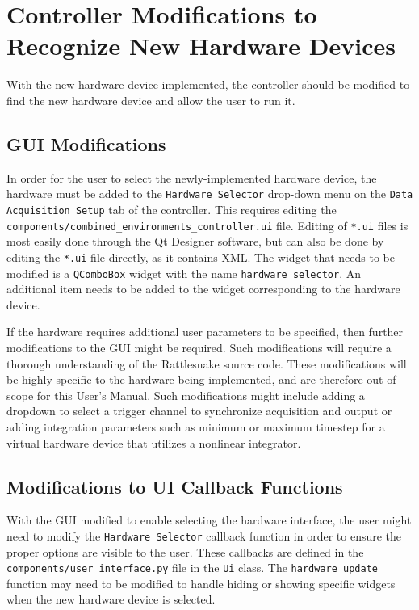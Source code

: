 \documentclass[pdf,12pt,report]{SANDreport}
\newcommand{\inlineCode}{\lstinline[basicstyle=\bfseries\ttfamily]}
\begin{document}
    \section{Controller Modifications to Recognize New Hardware Devices}
    With the new hardware device implemented, the controller should be modified to find the new hardware device and allow the user to run it.
    
    \subsection{\Ac{GUI} Modifications}
    In order for the user to select the newly-implemented hardware device, the hardware must be added to the \inlineCode{Hardware Selector} drop-down menu on the \inlineCode{Data Acquisition Setup} tab of the controller.  This requires editing the \inlineCode{components/combined_environments_controller.ui} file.  Editing of \inlineCode{*.ui} files is most easily done through the Qt Designer software, but can also be done by editing the \inlineCode{*.ui} file directly, as it contains XML.  The widget that needs to be modified is a \inlineCode{QComboBox} widget with the name \inlineCode{hardware_selector}.  An additional item needs to be added to the widget corresponding to the hardware device.
    
    If the hardware requires additional user parameters to be specified, then further modifications to the \ac{GUI} might be required.  Such modifications will require a thorough understanding of the Rattlesnake source code.  These modifications will be highly specific to the hardware being implemented, and are therefore out of scope for this User's Manual.  Such modifications might include adding a dropdown to select a trigger channel to synchronize acquisition and output or adding integration parameters such as minimum or maximum timestep for a virtual hardware device that utilizes a nonlinear integrator.
    
    \subsection{Modifications to \Ac{UI} Callback Functions}
    With the \ac{GUI} modified to enable selecting the hardware interface, the user might need to modify the \inlineCode{Hardware Selector} callback function in order to ensure the proper options are visible to the user.  These callbacks are defined in the \inlineCode{components/user_interface.py} file in the \inlineCode{Ui} class.  The \inlineCode{hardware_update} function may need to be modified to handle hiding or showing specific widgets when the new hardware device is selected.
    
\end{document}
